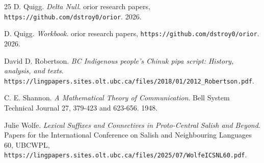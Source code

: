 \begin{thebibliography}{25}
D. Quigg. \emph{Delta Null}. orior research papers, \texttt{https:/\allowbreak{}/\allowbreak{}github.com/\allowbreak{}dstroy0/\allowbreak{}orior}. 2026.

D. Quigg. \emph{Workbook}. orior research papers, \texttt{https:/\allowbreak{}/\allowbreak{}github.com/\allowbreak{}dstroy0/\allowbreak{}orior}. 2026.

David D. Robertson. \emph{BC Indigenous people's Chinuk pipa script: History, analysis, and texts}. \texttt{https:/\allowbreak{}/\allowbreak{}lingpapers.sites.olt.ubc.ca/\allowbreak{}files/\allowbreak{}2018/\allowbreak{}01/\allowbreak{}2012\_\allowbreak{}Robertson.pdf}.

C. E. Shannon. \emph{A Mathematical Theory of Communication}. Bell System Technical Journal 27, 379-423 and 623-656. 1948.

Julie Wolfe. \emph{Lexical Suffixes and Connectives in Proto-Central Salish and Beyond}. Papers for the International Conference on Salish and Neighbouring Languages 60, UBCWPL, \texttt{https:/\allowbreak{}/\allowbreak{}lingpapers.sites.olt.ubc.ca/\allowbreak{}files/\allowbreak{}2025/\allowbreak{}07/\allowbreak{}WolfeICSNL60.pdf}.

\end{thebibliography}
